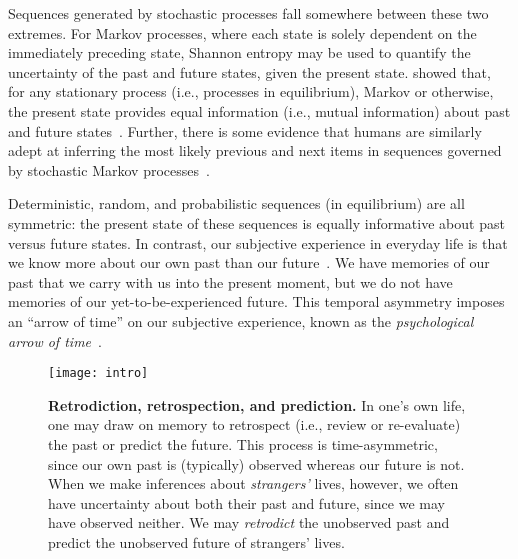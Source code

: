 \documentclass[10pt]{article}
\begin{document}
Sequences generated by stochastic processes fall somewhere between these two extremes. For Markov processes, where each state is solely dependent on the immediately preceding state, Shannon entropy may be used to quantify the uncertainty of the past and future states, given the present state. \cite{Cove94} showed that, for any stationary process (i.e., processes in equilibrium), Markov or otherwise, the present state provides equal information (i.e., mutual information) about past and future states~\citep[also see][]{BialEtal01, ElliEtal09}. Further, there is some evidence that humans are similarly adept at inferring the most likely previous and next items in sequences governed by stochastic Markov processes~\citep{JonePash07}.

Deterministic, random, and probabilistic sequences (in equilibrium) are all symmetric: the present state of these sequences is equally informative about past versus future states. In contrast, our subjective experience in everyday life is that we know more about our own past than our future~\citep[e.g.,][]{Horw87}. We have memories of our past that we carry with us into the present moment, but we do not have memories of our yet-to-be-experienced future. This temporal asymmetry imposes an ``arrow of time'' on our subjective experience, known as the \textit{psychological arrow of time}~\citep[e.g.,][]{Hawk85}.

\begin{figure}[tp]
  \centering
  \texttt{[image: intro]}

  \caption{\textbf{Retrodiction, retrospection, and prediction.} In one's own life, one may draw on memory to retrospect (i.e., review or re-evaluate) the past or predict the future. This process is time-asymmetric, since our own past is (typically) observed whereas our future is not. When we make inferences about \textit{strangers'} lives, however, we often have uncertainty about both their past and future, since we may have observed neither. We may \textit{retrodict} the unobserved past and predict the unobserved future of strangers' lives.}

  \label{fig:intro}
\end{figure}
\end{document}
